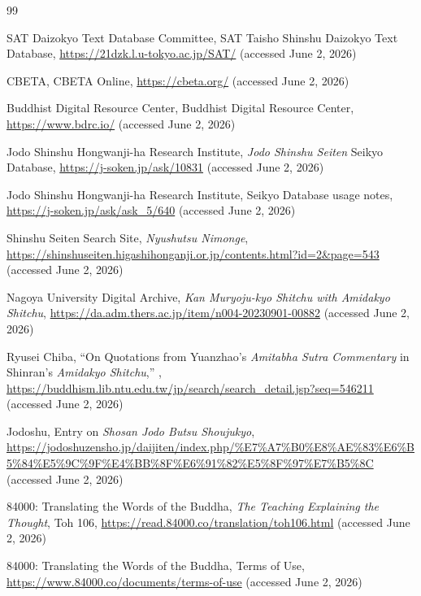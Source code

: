 \documentclass[uplatex,dvipdfmx,11pt,a4paper]{jsarticle}
\begin{document}
\begin{thebibliography}{99}

SAT Daizokyo Text Database Committee,
\newblock SAT Taisho Shinshu Daizokyo Text Database,
\newblock \url{https://21dzk.l.u-tokyo.ac.jp/SAT/} (accessed June 2, 2026)

CBETA,
\newblock CBETA Online,
\newblock \url{https://cbeta.org/} (accessed June 2, 2026)

Buddhist Digital Resource Center,
\newblock Buddhist Digital Resource Center,
\newblock \url{https://www.bdrc.io/} (accessed June 2, 2026)

Jodo Shinshu Hongwanji-ha Research Institute,
\newblock \textit{Jodo Shinshu Seiten} Seikyo Database,
\newblock \url{https://j-soken.jp/ask/10831} (accessed June 2, 2026)

Jodo Shinshu Hongwanji-ha Research Institute,
\newblock Seikyo Database usage notes,
\newblock \url{https://j-soken.jp/ask/ask_5/640} (accessed June 2, 2026)

Shinshu Seiten Search Site,
\newblock \textit{Nyushutsu Nimonge},
\newblock \url{https://shinshuseiten.higashihonganji.or.jp/contents.html?id=2&page=543} (accessed June 2, 2026)

Nagoya University Digital Archive,
\newblock \textit{Kan Muryoju-kyo Shitchu with Amidakyo Shitchu},
\newblock \url{https://da.adm.thers.ac.jp/item/n004-20230901-00882} (accessed June 2, 2026)

Ryusei Chiba,
\newblock ``On Quotations from Yuanzhao's \textit{Amitabha Sutra Commentary} in Shinran's \textit{Amidakyo Shitchu},''
,
\newblock \url{https://buddhism.lib.ntu.edu.tw/jp/search/search_detail.jsp?seq=546211} (accessed June 2, 2026)

Jodoshu,
\newblock Entry on \textit{Shosan Jodo Butsu Shoujukyo},
\newblock \url{https://jodoshuzensho.jp/daijiten/index.php/%E7%A7%B0%E8%AE%83%E6%B5%84%E5%9C%9F%E4%BB%8F%E6%91%82%E5%8F%97%E7%B5%8C} (accessed June 2, 2026)

84000: Translating the Words of the Buddha,
\newblock \textit{The Teaching Explaining the Thought}, Toh 106,
\newblock \url{https://read.84000.co/translation/toh106.html} (accessed June 2, 2026)

84000: Translating the Words of the Buddha,
\newblock Terms of Use,
\newblock \url{https://www.84000.co/documents/terms-of-use} (accessed June 2, 2026)


\end{thebibliography}
\end{document}
